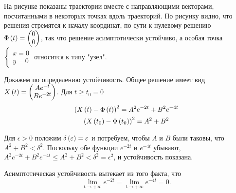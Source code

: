 \documentclass[a5paper,10pt]{article}
\begin{document}
На рисунке показаны траектории вместе с направляющими векторами, посчитанными в некоторых точках вдоль траекторий. По рисунку видно, что решения стремятся к началу координат, по сути к нулевому решению $\Phi\left(t\right) = \begin{pmatrix} 0 \\ 0 \end{pmatrix}$, так что решение асимптотически устойчиво, а особая точка $\left\{ \begin{matrix} x = 0 \\ y = 0 \end{matrix} \right.$ относится к типу "узел".

Докажем по определению устойчивость. Общее решение имеет вид $X\left(t\right) = \begin{pmatrix} A e^{-t} \\ B e^{-2t} \end{pmatrix}$. Для $t \ge t_{0} = 0$
\begin{gather*}
\left(X\left(t\right) - \Phi\left(t\right)\right)^2 = A^2 e^{-2t} + B^2 e^{-4t} \\
\left(X\left(t_{0}\right) - \Phi\left(t_{0}\right)\right)^2 = A^2 + B^2
\end{gather*}

Для $\epsilon > 0$ положим $\delta\left(\varepsilon\right) = \varepsilon$ и потребуем, чтобы $A$ и $B$ были таковы, что $A^2 + B^2 < \delta^2$. Поскольку обе функции $e^{-2t}$ и $e^{-4t}$ убывают, $A^2 e^{-2t} + B^2 e^{-4t} \le A^2 + B^2 < \delta^2 = \epsilon^2$, и устойчивость показана.

Асимптотическая устойчивость вытекает из того факта, что
$$\lim_{t \to +\infty} e^{-2t} = \lim_{t \to +\infty} e^{-4t} = 0.$$
\end{document}
